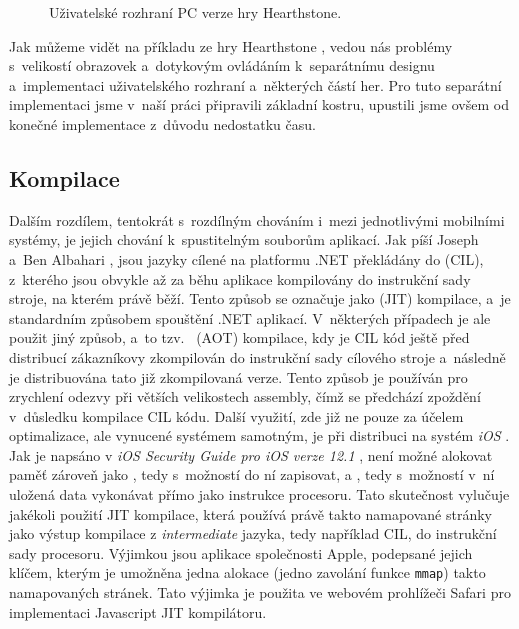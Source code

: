 \begin{figure}[!tbp]
	\centering
	\hfill
	\caption{Uživatelské rozhraní PC verze hry Hearthstone.}
	\label{fig:hearthstone_pc}
\end{figure}

Jak můžeme vidět na příkladu ze hry Hearthstone \citep{site:hearthstone}, vedou nás problémy s~velikostí obrazovek a~dotykovým ovládáním k~separátnímu designu a~implementaci uživatelského rozhraní a~některých částí her. Pro tuto separátní implementaci jsme v~naší práci připravili základní kostru, upustili jsme ovšem od konečné implementace z~důvodu nedostatku času.

\subsection{Kompilace}
Dalším rozdílem, tentokrát s~rozdílným chováním i~mezi jednotlivými mobilními systémy, je jejich chování k~spustitelným souborům aplikací. Jak píší Joseph a~Ben Albahari \citep[str.~3,4]{book:cs7nutshell}, jsou jazyky cílené na platformu .NET překládány do   (CIL), z~kterého jsou obvykle až za běhu aplikace kompilovány do instrukční sady stroje, na kterém právě běží. Tento způsob se označuje jako   (JIT) kompilace, a~je standardním způsobem spouštění .NET aplikací. V~některých případech je ale použit jiný způsob, a~to tzv.~  (AOT) kompilace, kdy je CIL kód ještě před distribucí zákazníkovy zkompilován do instrukční sady cílového stroje a~následně je distribuována tato již zkompilovaná verze. Tento způsob je používán pro zrychlení odezvy při větších velikostech assembly, čímž se předchází zpoždění v~důsledku kompilace CIL kódu. Další využití, zde již ne pouze za účelem optimalizace, ale vynucené systémem samotným, je při distribuci na systém \emph{iOS} \citep{site:aot}. Jak je napsáno v \textit{iOS Security Guide pro iOS verze 12.1} \citep[str.~27]{book:iossecurityguide}, není možné alokovat paměť zároveň jako \textit{ }, tedy s~možností do ní zapisovat, a \textit{}, tedy s~možností v~ní uložená data vykonávat přímo jako instrukce procesoru. Tato skutečnost vylučuje jakékoli použití JIT kompilace, která používá právě takto namapované stránky jako výstup kompilace z \textit{intermediate} jazyka, tedy například CIL, do instrukční sady procesoru. Výjimkou jsou aplikace společnosti Apple, podepsané jejich klíčem, kterým je umožněna jedna alokace (jedno zavolání funkce \texttt{mmap}) takto namapovaných stránek. Tato výjimka je použita ve webovém prohlížeči Safari pro implementaci Javascript JIT kompilátoru.  

